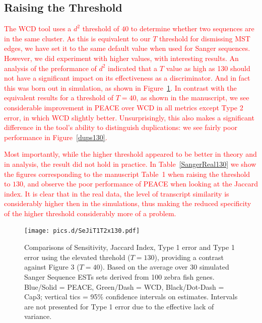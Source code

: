 \documentclass[a4paper,12pt]{article}
\newcommand{\mc}[1]{\textcolor{red}{#1}}
\newcommand{\peace} {{\small PEACE}}
\newcommand{\wcd} {{\small WCD}}
\newcommand{\capthree} {{\small Cap3}}
\begin{document}
\begin{appendix}
\subsection{Raising the Threshold}
\label{sim_thresh}
\mc{ 
  The \wcd\/ tool uses a $d^2$ threshold of $40$ to determine whether
  two sequences are in the same cluster.  As this is equivalent to our
  $T$ threshold for dismissing MST edges, we have set it to the same
  default value when used for Sanger} \mc{sequences.}  \mc{However,} \mc{we} \mc{did}
  \mc{experiment} \mc{with} \mc{higher} \mc{values,} \mc{with} \mc{interesting} \mc{results.  An
  analysis of the preformance of $d^2$ indicated that a $T$ value as high as 130 should not have a
  significant impact on its effectiveness as a discriminator.  And in
  fact this was born out in simulation, as shown in
  Figure~\ref{SeJiT1T2130}.  In contrast with the equivalent results
  for a threshold of $T=40$, as shown in the manuscript, we see
  considerable improvement in \peace\/ over \wcd\/ in all metrics
  except Type 2 error, in which \wcd\/ slightly
  better. Unsurprisingly, this also makes a significant difference in
  the tool's ability to distinguish duplications: we see fairly poor
  performance in Figure~\ref{dups130}.  
}

\mc{ Most importantly, while the higher threshold appeared to be
  better in theory and in analysis, the result did not hold in
  practice.  In Table~\ref{SangerReal130} we show the figures
  corresponding to the manuscript Table~1 when raising the threshold
  to $130$, and observe the poor performance of \peace\/ when looking
  at the Jaccard index.  It is clear that in the real data, the level
  of transcript similarity is considerably higher then in the simulations, thus
  making the reduced specificity of the higher threshold considerably
  more of a problem.  }


\begin{figure}
  \centerline{\texttt{[image: pics.d/SeJiT1T2x130.pdf]}}
  \caption{Comparisons of Sensitivity, Jaccard Index, Type 1 error and
    Type 1 error using the elevated threhold ($T=130$), providing a
    contrast against Figure 3 ($T=40$).  Based on the average over 30
    simulated Sanger Sequence ESTs sets derived from 100 zebra fish
    genes.  Blue/Solid = \peace, Green/Dash = \wcd, Black/Dot-Dash =
    \capthree; vertical tics = 95\% confidence intervals on estimates.
    Intervals are not presented for Type 1 error due to the effective
    lack of variance.}\label{SeJiT1T2130}
\end{figure}


\end{appendix}
\end{document}

